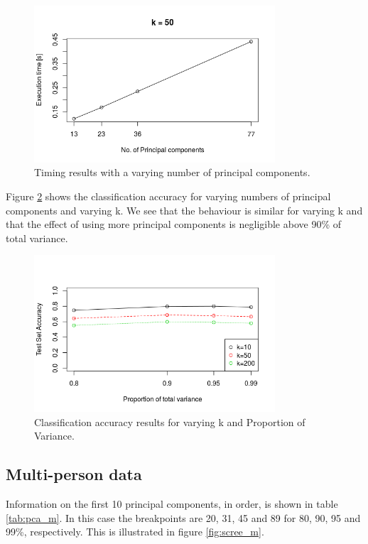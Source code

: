 \documentclass[paper=a4, fontsize=11pt]{scrartcl} %
\begin{document}
\begin{figure}[h]
	\centering
	\includegraphics[width=0.8\textwidth]{timing.png}
	\caption{Timing results with a varying number of principal components.}
	\label{fig:timing}
\end{figure}

Figure \ref{fig:acc} shows the classification accuracy for varying numbers of principal components and varying k. We see that the behaviour is similar for varying k and that the effect of using more principal components is negligible above 90\% of total variance.

\begin{figure}[h]
	\centering
	\includegraphics[width=0.8\textwidth]{accuracy2.png}
	\caption{Classification accuracy results for varying k and Proportion of Variance.}
	\label{fig:acc}
\end{figure}

\clearpage
\subsection{Multi-person data}

Information on the first 10 principal components, in order, is shown in table \ref{tab:pca_m}. In this case the breakpoints are 20, 31, 45 and 89 for 80, 90, 95 and 99\%, respectively. This is illustrated in figure \ref{fig:scree_m}.\par
\end{document}
